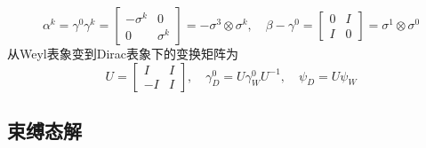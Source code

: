 \documentclass{article}
\numberwithin{equation}{subsection}
\begin{document}
    \begin{equation}
        \alpha^k=\gamma^0\gamma^k=\begin{bmatrix}
            -\sigma^k&0\\
            0&\sigma^k
        \end{bmatrix}=-\sigma^3\otimes\sigma^k,\quad\beta-\gamma^0=\begin{bmatrix}
            0&I\\
            I&0
        \end{bmatrix}=\sigma^1\otimes\sigma^0
    \end{equation}
    从Weyl表象变到Dirac表象下的变换矩阵为
    \begin{equation}
        U=\begin{bmatrix}
            I&I\\
            -I&I
        \end{bmatrix},\quad \gamma_D^0=U\gamma_W^0U^{-1},\quad\psi_D=U\psi_W
    \end{equation}
\subsection{束缚态解}
\end{document}
